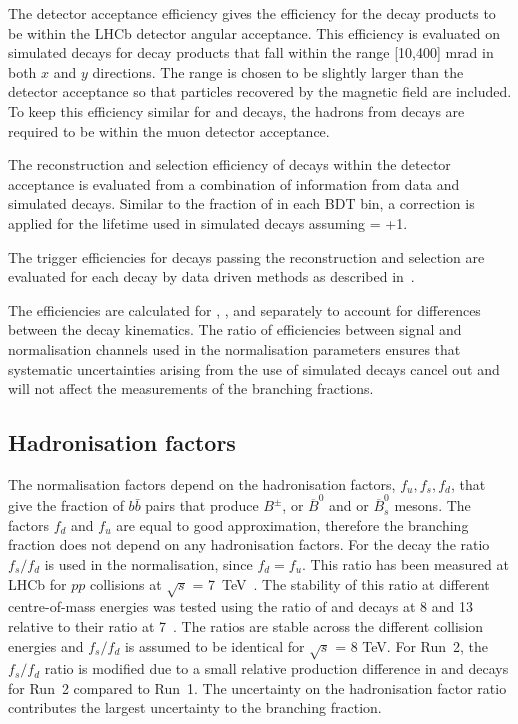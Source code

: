 {{The detector acceptance efficiency gives the efficiency for the decay products to be within the LHCb detector angular acceptance. This efficiency is evaluated on simulated decays for decay products that fall within the range [10,400] mrad in both $x$ and $y$ directions. The range is chosen to be slightly larger than the detector acceptance so that particles recovered by the magnetic field are included. To keep this efficiency similar for \bmumu and \bdkpi decays, the hadrons from \bdkpi decays are required to be within the muon detector acceptance. 

The reconstruction and selection efficiency of decays within the detector acceptance is evaluated from a combination of information from data and simulated decays. Similar to the fraction of \bsmumu in each BDT bin, a correction is applied for the lifetime used in simulated \bsmumu decays assuming \ADG = +1. 

The trigger efficiencies for decays passing the reconstruction and selection are evaluated for each decay by data driven methods as described in~\cite{Tolk:2148631, Tolk:1557354}. %

The efficiencies are calculated for \bsmumu, \bdmumu, \bdkpi and \bujpsik separately to account for differences between the decay kinematics. The ratio of efficiencies between signal and normalisation channels used in the normalisation parameters ensures that systematic uncertainties arising from the use of simulated decays cancel out and will not affect the measurements of the \bmumu branching fractions.

\subsection{Hadronisation factors}
\label{hadronfact}
The normalisation factors depend on the hadronisation factors, $f_{u}, f_{s}, f_{d}$, that give the fraction of $b\bar{b}$ pairs that produce $B^{\pm}$, \bd or $\overline{B}^{0}$ and \bs or $\overline{B}^{0}_{s}$ mesons. %
The factors $f_{d}$ and $f_{u}$ are equal to good approximation, therefore the \bdmumu branching fraction does not depend on any hadronisation factors. For the \bsmumu decay the ratio $f_{s}/f_{d}$ is used in the normalisation, since $f_{d} = f_{u}$. This ratio has been measured at LHCb for $pp$ collisions at $\sqrt{s}$ = 7~TeV~\cite{LHCb-CONF-2013-011}. The stability of this ratio at different centre-of-mass energies was tested using the ratio of \bsjpsiphi and \bujpsik decays at 8 and 13 \tev relative to their ratio at 7~\tev. %
The ratios are stable across the different collision energies and $f_{s}/f_{d}$ is assumed to be identical for $\sqrt{s}$ = 8 TeV. For Run~2, the $f_{s}/f_{d}$ ratio is modified due to a small relative production difference in \bsjpsiphi and \bujpsik decays for Run~2 compared to Run~1. 
The uncertainty on the hadronisation factor ratio contributes the largest uncertainty to the \bsmumu branching fraction. 

}}
